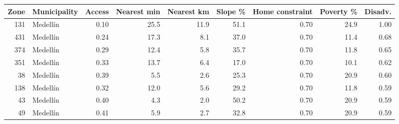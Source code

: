 \begin{tabular}{rlrrrrrrr}
\toprule
Zone & Municipality & Access & Nearest min & Nearest km & Slope \% & Home constraint & Poverty \% & Disadv. \\
\midrule
131 & Medellín & 0.10 & 25.5 & 11.9 & 51.1 & 0.70 & 24.9 & 1.00 \\
431 & Medellín & 0.24 & 17.3 & 8.1 & 37.0 & 0.70 & 11.4 & 0.68 \\
374 & Medellín & 0.29 & 12.4 & 5.8 & 35.7 & 0.70 & 11.8 & 0.65 \\
351 & Medellín & 0.33 & 13.7 & 6.4 & 17.0 & 0.70 & 10.1 & 0.62 \\
38 & Medellín & 0.39 & 5.5 & 2.6 & 25.3 & 0.70 & 20.9 & 0.60 \\
138 & Medellín & 0.32 & 12.0 & 5.6 & 29.2 & 0.70 & 11.8 & 0.59 \\
43 & Medellín & 0.40 & 4.3 & 2.0 & 50.2 & 0.70 & 20.9 & 0.59 \\
49 & Medellín & 0.41 & 5.9 & 2.7 & 32.8 & 0.70 & 20.9 & 0.59 \\
\bottomrule
\end{tabular}
